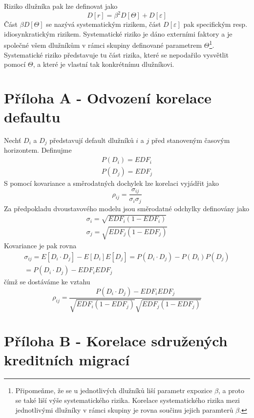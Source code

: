 Riziko dlužníka pak lze definovat jako
\begin{equation}
D[r] = \beta ^ 2 D[\Theta] + D[\varepsilon]
\end{equation}
Část $\beta D[\Theta]$ se nazývá systematickým rizikem, část $D[\varepsilon]$ pak specifickým resp. idiosynkratickým rizikem. Systematické riziko je dáno externími faktory a je společné všem dlužníkům v rámci skupiny definované parametrem $\Theta$\footnote{Připomeňme, že se u jednotlivých dlužníků liší parametr expozice $\beta$, a proto se také liší výše systematického rizika. Korelace systematického rizika mezi jednotlivými dlužníky v rámci skupiny je rovna součinu jejich paramterů $\beta$.}. Systematické riziko představuje tu část rizika, které se nepodařilo vysvětlit pomocí $\Theta$, a které je vlastní tak konkrétnímu dlužníkovi.
 
\section{Příloha A - Odvození korelace defaultu}

Nechť $D_i$ a $D_j$ představují default dlužníků $i$ a $j$ před stanoveným časovým horizontem. Definujme
\begin{align*}
P(D_i) = EDF_i\\
P(D_j) = EDF_j
\end{align*}
S pomocí kovariance a směrodatných dochylek lze korelaci vyjádřit jako
\begin{equation*}
\rho_{ij} = \frac{\sigma_{ij}}{\sigma_i \sigma_j}
\end{equation*}
Za předpokladu dvoustavového modelu jsou směrodatné odchylky definovány jako
\begin{align*}
\sigma_i = \sqrt{EDF_i(1 - EDF_i)}\\
\sigma_j = \sqrt{EDF_j(1 - EDF_j)}
\end{align*}
Kovariance je pak rovna
\begin{multline*}
\sigma_{ij} = E[D_i \cdot D_j] - E[D_i]E[D_j] = P(D_i \cdot D_j) - P(D_i)P(D_j)\\
= P(D_i \cdot D_j) - EDF_i EDF_j
\end{multline*}
čímž se dostáváme ke vztahu
\begin{equation*}
\rho_{ij} = \frac{P(D_i \cdot D_j) - EDF_i EDF_j}{\sqrt{EDF_i(1 - EDF_j)}\sqrt{EDF_j(1 - EDF_j)}}
\end{equation*}

\section{Příloha B - Korelace sdružených kreditních migrací}

